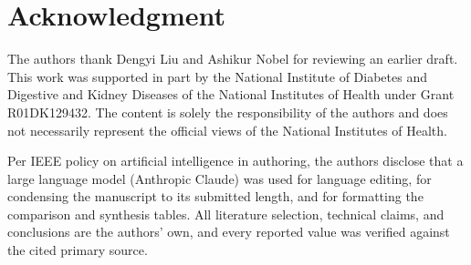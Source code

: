 \documentclass[journal]{IEEEtran}
\begin{document}
\fi

\section*{Acknowledgment}
The authors thank Dengyi Liu and Ashikur Nobel for reviewing an earlier draft. This work was supported in part by the National Institute of Diabetes and Digestive and Kidney Diseases of the National Institutes of Health under Grant R01DK129432. The content is solely the responsibility of the authors and does not necessarily represent the official views of the National Institutes of Health.

Per IEEE policy on artificial intelligence in authoring, the authors disclose that a large language model (Anthropic Claude) was used for language editing, for condensing the manuscript to its submitted length, and for formatting the comparison and synthesis tables. All literature selection, technical claims, and conclusions are the authors' own, and every reported value was verified against the cited primary source.



\end{document}
